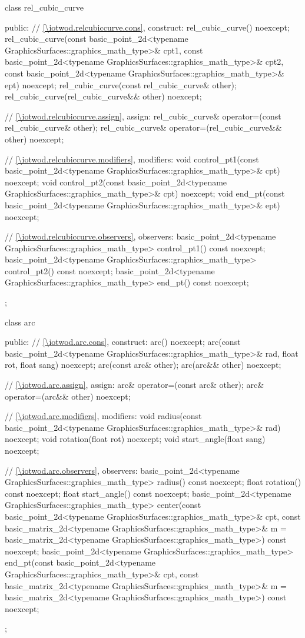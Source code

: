 \begin{codeblock}
{{    class rel_cubic_curve {
    public:
      // \ref{\iotwod.relcubiccurve.cons}, construct:
      rel_cubic_curve() noexcept;
      rel_cubic_curve(const basic_point_2d<typename GraphicsSurfaces::graphics_math_type>& cpt1,
      const basic_point_2d<typename GraphicsSurfaces::graphics_math_type>& cpt2,
      const basic_point_2d<typename GraphicsSurfaces::graphics_math_type>& ept) noexcept;
      rel_cubic_curve(const rel_cubic_curve& other);
      rel_cubic_curve(rel_cubic_curve&& other) noexcept;

      // \ref{\iotwod.relcubiccurve.assign}, assign:
      rel_cubic_curve& operator=(const rel_cubic_curve& other);
      rel_cubic_curve& operator=(rel_cubic_curve&& other) noexcept;

      // \ref{\iotwod.relcubiccurve.modifiers}, modifiers:
      void control_pt1(const basic_point_2d<typename
        GraphicsSurfaces::graphics_math_type>& cpt) noexcept;
      void control_pt2(const basic_point_2d<typename
        GraphicsSurfaces::graphics_math_type>& cpt) noexcept;
      void end_pt(const basic_point_2d<typename
        GraphicsSurfaces::graphics_math_type>& ept) noexcept;

      // \ref{\iotwod.relcubiccurve.observers}, observers:
      basic_point_2d<typename GraphicsSurfaces::graphics_math_type> control_pt1() const noexcept;
      basic_point_2d<typename GraphicsSurfaces::graphics_math_type> control_pt2() const noexcept;
      basic_point_2d<typename GraphicsSurfaces::graphics_math_type> end_pt() const noexcept;
    };

    class arc {
    public:
      // \ref{\iotwod.arc.cons}, construct:
      arc() noexcept;
      arc(const basic_point_2d<typename GraphicsSurfaces::graphics_math_type>& rad, float rot, float sang) noexcept;
      arc(const arc& other);
      arc(arc&& other) noexcept;

      // \ref{\iotwod.arc.assign}, assign:
      arc& operator=(const arc& other);
      arc& operator=(arc&& other) noexcept;

      // \ref{\iotwod.arc.modifiers}, modifiers:
      void radius(const basic_point_2d<typename GraphicsSurfaces::graphics_math_type>& rad) noexcept;
      void rotation(float rot) noexcept;
      void start_angle(float sang) noexcept;

      // \ref{\iotwod.arc.observers}, observers:
      basic_point_2d<typename GraphicsSurfaces::graphics_math_type> radius() const noexcept;
      float rotation() const noexcept;
      float start_angle() const noexcept;
      basic_point_2d<typename GraphicsSurfaces::graphics_math_type> center(const basic_point_2d<typename
        GraphicsSurfaces::graphics_math_type>& cpt, const basic_matrix_2d<typename
        GraphicsSurfaces::graphics_math_type>& m = basic_matrix_2d<typename
        GraphicsSurfaces::graphics_math_type>{}) const noexcept;
      basic_point_2d<typename GraphicsSurfaces::graphics_math_type> end_pt(const basic_point_2d<typename
        GraphicsSurfaces::graphics_math_type>& cpt, const basic_matrix_2d<typename
        GraphicsSurfaces::graphics_math_type>& m = basic_matrix_2d<typename
        GraphicsSurfaces::graphics_math_type>{}) const noexcept;
    };

}}
\end{codeblock}
